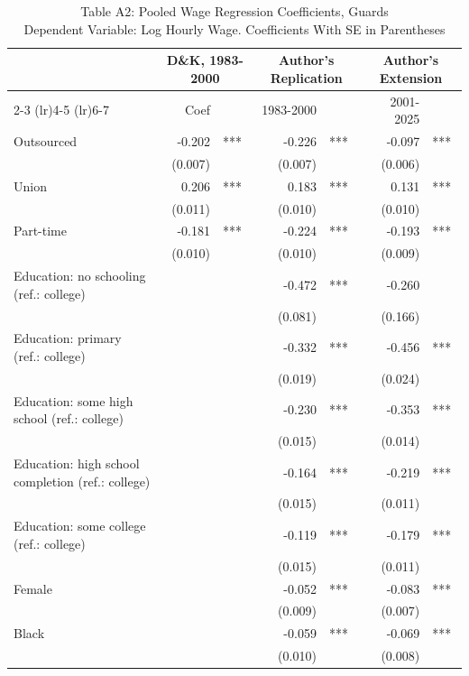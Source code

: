 \begin{table}[!t]
\caption*{
{\large Table A2: Pooled Wage Regression Coefficients, Guards} \\
{\small Dependent Variable: Log Hourly Wage. Coefficients With SE in Parentheses}
} 

\fontsize{10.0pt}{12.0pt}\selectfont

\begin{tabular*}{\linewidth}{@{\extracolsep{\fill}}l|rlrl|rl}
\toprule
  & \multicolumn{2}{c}{D\&K, 1983-2000} & \multicolumn{2}{c}{Author's Replication} & \multicolumn{2}{c}{Author's Extension} \\ 
\cmidrule(lr){2-3} \cmidrule(lr){4-5} \cmidrule(lr){6-7}
  & Coef &  & 1983-2000 &  & 2001-2025 &  \\ 
\midrule\addlinespace[2.5pt]
Outsourced & -0.202 & *** & -0.226 & *** & -0.097 & *** \\
 & (0.007) &  & (0.007) &  & (0.006) &  \\
Union & 0.206 & *** & 0.183 & *** & 0.131 & *** \\
 & (0.011) &  & (0.010) &  & (0.010) &  \\
Part-time & -0.181 & *** & -0.224 & *** & -0.193 & *** \\
 & (0.010) &  & (0.010) &  & (0.009) &  \\
Education: no schooling (ref.: college) &  &  & -0.472 & *** & -0.260 &  \\
 &  &  & (0.081) &  & (0.166) &  \\
Education: primary (ref.: college) &  &  & -0.332 & *** & -0.456 & *** \\
 &  &  & (0.019) &  & (0.024) &  \\
Education: some high school (ref.: college) &  &  & -0.230 & *** & -0.353 & *** \\
 &  &  & (0.015) &  & (0.014) &  \\
Education: high school completion (ref.: college) &  &  & -0.164 & *** & -0.219 & *** \\
 &  &  & (0.015) &  & (0.011) &  \\
Education: some college (ref.: college) &  &  & -0.119 & *** & -0.179 & *** \\
 &  &  & (0.015) &  & (0.011) &  \\
Female &  &  & -0.052 & *** & -0.083 & *** \\
 &  &  & (0.009) &  & (0.007) &  \\
Black &  &  & -0.059 & *** & -0.069 & *** \\
 &  &  & (0.010) &  & (0.008) &  \\

\end{tabular*}
\end{table}
